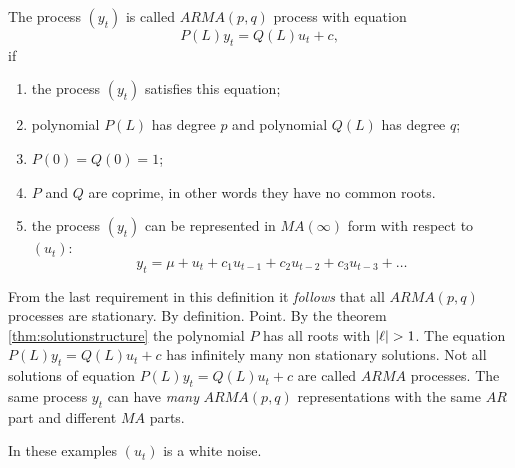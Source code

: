 \documentclass[12pt]{article} %
\begin{document}
\begin{definition}
    The process $(y_t)$ is called $ARMA(p, q)$ process with equation  
    \[
    P(L) y_t = Q(L) u_t + c,    
    \]
    if 
    \begin{enumerate}
        \item the process $(y_t)$ satisfies this equation;
        \item polynomial $P(L)$ has degree $p$ and polynomial $Q(L)$ has degree $q$;
        \item $P(0) = Q(0) = 1$;
        \item $P$ and $Q$ are coprime, in other words they have no common roots. 
        \item the process $(y_t)$ can be represented in $MA(\infty)$ form with respect to $(u_t)$:
        \[
            y_t = \mu + u_t + c_1 u_{t-1} + c_2 u_{t-2} + c_3 u_{t-3} + \ldots
        \]
    \end{enumerate}
\end{definition}


From the last requirement in this definition it \textit{follows} that all $ARMA(p,q)$ processes are 
stationary. By definition. Point. By the theorem \ref{thm:solutionstructure} the polynomial $P$ has all roots with $\abs{\ell} > 1$.
The equation $P(L) y_t = Q(L) u_t + c$ has infinitely many non stationary solutions. 
Not all solutions of equation $P(L) y_t = Q(L) u_t + c$ are called $ARMA$ processes. 
The same process $y_t$ can have \textit{many} $ARMA(p, q)$ representations with the same $AR$ part and 
different $MA$ parts. 

In these examples $(u_t)$ is a white noise. 
\end{document}
